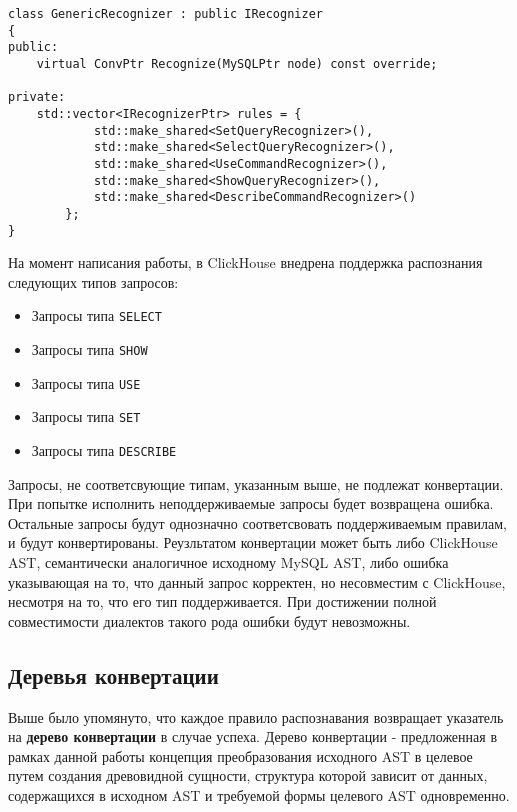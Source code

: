 \begin{code}
    \label{conv:GenericRecognizer}
    \begin{verbatim}
class GenericRecognizer : public IRecognizer
{
public:
    virtual ConvPtr Recognize(MySQLPtr node) const override;

private:
    std::vector<IRecognizerPtr> rules = {
            std::make_shared<SetQueryRecognizer>(),
            std::make_shared<SelectQueryRecognizer>(),
            std::make_shared<UseCommandRecognizer>(),
            std::make_shared<ShowQueryRecognizer>(),
            std::make_shared<DescribeCommandRecognizer>()
        };
}
    \end{verbatim}
\end{code}

На момент написания работы, в ClickHouse внедрена поддержка распознания следующих типов запросов:
\begin{itemize}
    \item Запросы типа \texttt{SELECT}
    \item Запросы типа \texttt{SHOW}
    \item Запросы типа \texttt{USE}
    \item Запросы типа \texttt{SET}
    \item Запросы типа \texttt{DESCRIBE}
\end{itemize}

Запросы, не соответсвующие типам, указанным выше, не подлежат конвертации. При попытке исполнить неподдерживаемые запросы будет возвращена ошибка. Остальные запросы будут однозначно соответсвовать поддерживаемым правилам, и будут конвертированы. Реузльтатом конвертации может быть либо ClickHouse AST, семантически аналогичное исходному MySQL AST, либо ошибка указывающая на то, что данный запрос корректен, но несовместим с ClickHouse, несмотря на то, что его тип поддерживается. При достижении полной совместимости диалектов такого рода ошибки будут невозможны. 

\subsection{Деревья конвертации} \label{conv_tree}
Выше было упомянуто, что каждое правило распознавания возвращает указатель на \textbf{дерево конвертации} в случае успеха. Дерево конвертации - предложенная в рамках данной работы концепция преобразования исходного AST в целевое путем создания древовидной сущности, структура которой зависит от данных, содержащихся в исходном AST и требуемой формы целевого AST одновременно. 

